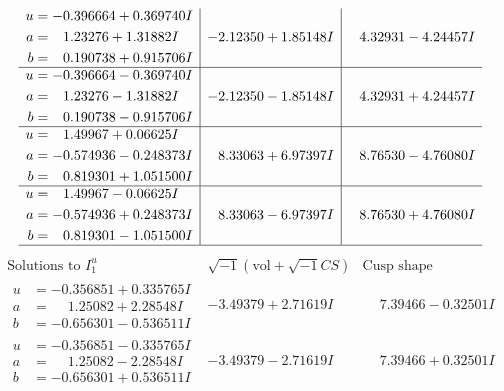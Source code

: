 \documentclass[1p]{elsarticle_modified}
\theoremstyle{definition}
\newcommand{\I}{\sqrt{-1}}
\begin{document}
$$\begin{array}{c|c|c}
\begin{aligned}
u &= -0.396664 + 0.369740 I \\
a &= \phantom{-}1.23276 + 1.31882 I \\
b &= \phantom{-}0.190738 + 0.915706 I\end{aligned}
 & -2.12350 + 1.85148 I & \phantom{-}4.32931 - 4.24457 I \\ \hline\begin{aligned}
u &= -0.396664 - 0.369740 I \\
a &= \phantom{-}1.23276 - 1.31882 I \\
b &= \phantom{-}0.190738 - 0.915706 I\end{aligned}
 & -2.12350 - 1.85148 I & \phantom{-}4.32931 + 4.24457 I \\ \hline\begin{aligned}
u &= \phantom{-}1.49967 + 0.06625 I \\
a &= -0.574936 - 0.248373 I \\
b &= \phantom{-}0.819301 + 1.051500 I\end{aligned}
 & \phantom{-}8.33063 + 6.97397 I & \phantom{-}8.76530 - 4.76080 I \\ \hline\begin{aligned}
u &= \phantom{-}1.49967 - 0.06625 I \\
a &= -0.574936 + 0.248373 I \\
b &= \phantom{-}0.819301 - 1.051500 I\end{aligned}
 & \phantom{-}8.33063 - 6.97397 I & \phantom{-}8.76530 + 4.76080 I\\
 \hline 
 \end{array}$$\newpage$$\begin{array}{c|c|c}  
\text{Solutions to }I^u_{1}& \I (\text{vol} + \sqrt{-1}CS) & \text{Cusp shape}\\
 \hline 
\begin{aligned}
u &= -0.356851 + 0.335765 I \\
a &= \phantom{-}1.25082 + 2.28548 I \\
b &= -0.656301 - 0.536511 I\end{aligned}
 & -3.49379 + 2.71619 I & \phantom{-}7.39466 - 0.32501 I \\ \hline\begin{aligned}
u &= -0.356851 - 0.335765 I \\
a &= \phantom{-}1.25082 - 2.28548 I \\
b &= -0.656301 + 0.536511 I\end{aligned}
 & -3.49379 - 2.71619 I & \phantom{-}7.39466 + 0.32501 I \\ \hline\begin{aligned}

\end{aligned}
\end{array}$$
\end{document}
